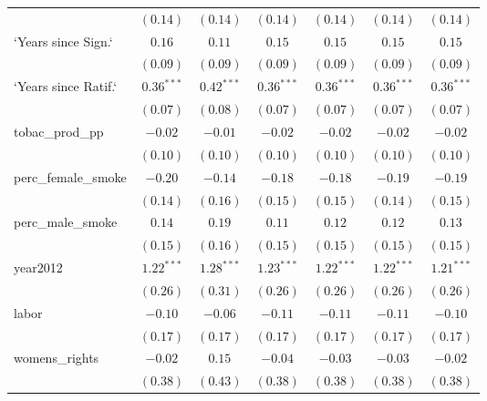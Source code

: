 \begin{table}[!h]
\begin{center}
\begin{tabular}{l c c c c c c }
                        & $(0.14)$     & $(0.14)$     & $(0.14)$     & $(0.14)$     & $(0.14)$     & $(0.14)$     \\
`Years since Sign.`     & $0.16$       & $0.11$       & $0.15$       & $0.15$       & $0.15$       & $0.15$       \\
                        & $(0.09)$     & $(0.09)$     & $(0.09)$     & $(0.09)$     & $(0.09)$     & $(0.09)$     \\
`Years since Ratif.`    & $0.36^{***}$ & $0.42^{***}$ & $0.36^{***}$ & $0.36^{***}$ & $0.36^{***}$ & $0.36^{***}$ \\
                        & $(0.07)$     & $(0.08)$     & $(0.07)$     & $(0.07)$     & $(0.07)$     & $(0.07)$     \\
tobac\_prod\_pp         & $-0.02$      & $-0.01$      & $-0.02$      & $-0.02$      & $-0.02$      & $-0.02$      \\
                        & $(0.10)$     & $(0.10)$     & $(0.10)$     & $(0.10)$     & $(0.10)$     & $(0.10)$     \\
perc\_female\_smoke     & $-0.20$      & $-0.14$      & $-0.18$      & $-0.18$      & $-0.19$      & $-0.19$      \\
                        & $(0.14)$     & $(0.16)$     & $(0.15)$     & $(0.15)$     & $(0.14)$     & $(0.15)$     \\
perc\_male\_smoke       & $0.14$       & $0.19$       & $0.11$       & $0.12$       & $0.12$       & $0.13$       \\
                        & $(0.15)$     & $(0.16)$     & $(0.15)$     & $(0.15)$     & $(0.15)$     & $(0.15)$     \\
year2012                & $1.22^{***}$ & $1.28^{***}$ & $1.23^{***}$ & $1.22^{***}$ & $1.22^{***}$ & $1.21^{***}$ \\
                        & $(0.26)$     & $(0.31)$     & $(0.26)$     & $(0.26)$     & $(0.26)$     & $(0.26)$     \\
labor                   & $-0.10$      & $-0.06$      & $-0.11$      & $-0.11$      & $-0.11$      & $-0.10$      \\
                        & $(0.17)$     & $(0.17)$     & $(0.17)$     & $(0.17)$     & $(0.17)$     & $(0.17)$     \\
womens\_rights          & $-0.02$      & $0.15$       & $-0.04$      & $-0.03$      & $-0.03$      & $-0.02$      \\
                        & $(0.38)$     & $(0.43)$     & $(0.38)$     & $(0.38)$     & $(0.38)$     & $(0.38)$     \\

\end{tabular}
\end{center}
\end{table}
